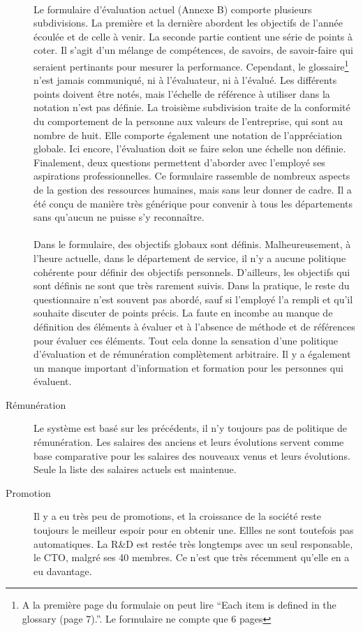 \begin{description}
\paragraph{}Le formulaire d'évaluation actuel (Annexe B) comporte plusieurs subdivisions. La première et la dernière abordent les objectifs de l'année écoulée et de celle à venir. La seconde partie contient une série de points à coter. Il s'agit d'un mélange de compétences, de savoirs, de savoir-faire qui seraient pertinants pour mesurer la performance. Cependant, le glossaire\footnote{A la première page du formulaie on peut lire \enquote{Each item is defined in the glossary (page 7).}. Le formulaire ne compte que 6 pages} n'est jamais communiqué, ni à l'évaluateur, ni à l'évalué. Les différents points doivent être notés, mais l'échelle de référence à utiliser dans la notation n'est pas définie. La troisième subdivision traite de la conformité du comportement de la personne aux valeurs de l'entreprise, qui sont au nombre de huit. Elle comporte également une notation de l'appréciation globale. Ici encore, l'évaluation doit se faire selon une échelle non définie. Finalement, deux questions permettent d'aborder avec l'employé ses aspirations professionnelles. Ce formulaire rassemble de nombreux aspects de la gestion des ressources humaines, mais sans leur donner de cadre. Il a été conçu de manière très générique pour convenir à tous les départements sans qu'aucun ne puisse s'y reconnaître.

\paragraph{}Dans le formulaire, des objectifs globaux sont définis. Malheureusement, à l'heure actuelle, dans le département de service, il n'y a aucune politique cohérente pour définir des objectifs personnels. D'ailleurs, les objectifs qui sont définis ne sont que très rarement suivis. Dans la pratique, le reste du questionnaire n'est souvent pas abordé, sauf si l'employé l'a rempli et qu'il souhaite discuter de points précis. La faute en incombe au manque de définition des éléments à évaluer et à l'absence de méthode et de références pour évaluer ces éléments. Tout cela donne la sensation d'une politique d'évaluation et de rémunération complètement arbitraire. Il y a également un manque important d'information et formation pour les personnes qui évaluent.
  \item[Rémunération] Le système est basé sur les précédents, il n'y toujours pas de politique de rémunération. Les salaires des anciens et leurs évolutions servent comme base comparative pour les salaires des nouveaux venus et leurs évolutions. Seule la liste des salaires actuels est maintenue.
  
  \item[Promotion] Il y a eu très peu de promotions, et la croissance de la société reste toujours le meilleur espoir pour en obtenir une. Ellles ne sont toutefois pas automatiques. La R\&D est restée très longtemps avec un seul responsable, le CTO, malgré ses 40 membres. Ce n'est que très récemment qu'elle en a eu davantage.  
\end{description}


